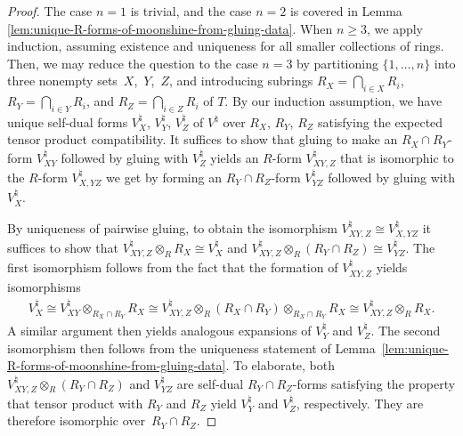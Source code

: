 \begin{proof}
The case $n=1$ is trivial, and the case $n=2$ is covered in Lemma \ref{lem:unique-R-forms-of-moonshine-from-gluing-data}. When $n \geq 3$, we apply induction, assuming existence and uniqueness for all smaller collections of rings. Then, we may reduce the question to the case $n=3$ by partitioning $\{1,\ldots,n\}$ into three nonempty sets~$X$,~$Y$,~$Z$, and introducing subrings $R_X = \bigcap_{i \in X} R_i$, $R_Y = \bigcap_{i \in Y} R_i$, and $R_Z = \bigcap_{i \in Z} R_i$ of $T$. By our induction assumption, we have unique self-dual forms $V^\natural_X$, $V^\natural_Y$, $V^\natural_Z$ of $V^\natural$ over $R_X$, $R_Y$, $R_Z$ satisfying the expected tensor product compatibility. It suffices to show that gluing to make an $R_X \cap R_Y$-form $V^\natural_{XY}$ followed by gluing with $V^\natural_Z$ yields an $R$-form $V^\natural_{XY,Z}$ that is isomorphic to the $R$-form $V^\natural_{X,YZ}$ we get by forming an $R_Y \cap R_Z$-form $V^\natural_{YZ}$ followed by gluing with $V^\natural_X$.

By uniqueness of pairwise gluing, to obtain the isomorphism $V^\natural_{XY,Z} \cong V^\natural_{X,YZ}$ it suffices to show that $V^\natural_{XY,Z} \otimes_{R} R_X \cong V^\natural_X$ and $V^\natural_{XY,Z} \otimes_{R} (R_Y \cap R_Z) \cong V^\natural_{YZ}$. The first isomorphism follows from the fact that the formation of $V^\natural_{XY,Z}$ yields isomorphisms
\begin{gather*}
V^\natural_X \cong V^\natural_{XY} \otimes_{R_X \cap R_Y} R_X \cong V^\natural_{XY,Z} \otimes_{R} (R_X \cap R_Y) \otimes_{R_X \cap R_Y} R_X \cong V^\natural_{XY,Z} \otimes_{R} R_X.
\end{gather*}
A similar argument then yields analogous expansions of $V^\natural_Y$ and $V^\natural_Z$. The second isomorphism then follows from the uniqueness statement of Lemma~\ref{lem:unique-R-forms-of-moonshine-from-gluing-data}. To elaborate, both $V^\natural_{XY,Z} \otimes_{R} (R_Y \cap R_Z)$ and $V^\natural_{YZ}$ are self-dual $R_Y \cap R_Z$-forms satisfying the property that tensor product with $R_Y$ and $R_Z$ yield $V^\natural_Y$ and $V^\natural_Z$, respectively. They are therefore isomorphic over~$R_Y \cap R_Z$.
\end{proof}

